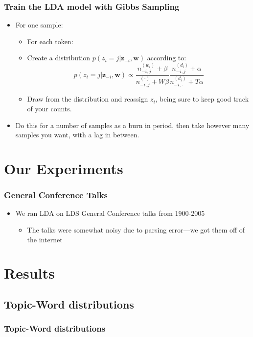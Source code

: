 \documentclass{beamer}
\begin{document}
\begin{frame}
  \frametitle{Train the LDA model with Gibbs Sampling}
  \begin{itemize}
	\item For one sample:
	  \begin{itemize}
		\item For each token:
		\item Create a distribution $p(z_i=j|\mathbf{z}_{-i},\mathbf{w})$
		  according to:
		  \[p(z_i = j|\mathbf{z}_{-i},\mathbf{w}) \propto 
		  \frac{n_{-i,j}^{(w_i)}+\beta}{n_{-i,j}^{(\cdot)}+W\beta}
		  \frac{n_{-i,j}^{(d_i)}+\alpha}{n_{-i,\cdot}^{(d_i)}+T\alpha}\]
		\item Draw from the distribution and reassign $z_i$, being sure to 
		  keep good track of your counts.
	  \end{itemize}
	\item Do this for a number of samples as a burn in period, then take however
	  many samples you want, with a lag in between.
  \end{itemize}
\end{frame}

\section{Our Experiments}

\begin{frame}
  \frametitle{General Conference Talks}
  \begin{itemize}
	\item We ran LDA on LDS General Conference talks from 1900-2005
	  \pause
	  \begin{itemize}
		\item The talks were somewhat noisy due to parsing error---we got them
		  off of the internet
	  \end{itemize}
  \end{itemize}
\end{frame}

\section{Results}

\subsection{Topic-Word distributions}

\begin{frame}
  \frametitle{Topic-Word distributions}
\end{frame}
\end{document}
